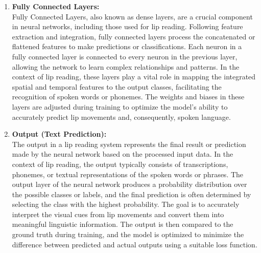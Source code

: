 \begin{enumerate}
	\item \textbf{Fully Connected Layers:}
	\\Fully Connected Layers, also known as dense layers, are a crucial component in neural networks, including those used for lip reading. Following feature extraction and integration, fully connected layers process the concatenated or flattened features to make predictions or classifications. Each neuron in a fully connected layer is connected to every neuron in the previous layer, allowing the network to learn complex relationships and patterns. In the context of lip reading, these layers play a vital role in mapping the integrated spatial and temporal features to the output classes, facilitating the recognition of spoken words or phonemes. The weights and biases in these layers are adjusted during training to optimize the model's ability to accurately predict lip movements and, consequently, spoken language.

	\item \textbf{Output (Text Prediction):}
	\\The output in a lip reading system represents the final result or prediction made by the neural network based on the processed input data. In the context of lip reading, the output typically consists of transcriptions, phonemes, or textual representations of the spoken words or phrases. The output layer of the neural network produces a probability distribution over the possible classes or labels, and the final prediction is often determined by selecting the class with the highest probability. The goal is to accurately interpret the visual cues from lip movements and convert them into meaningful linguistic information. The output is then compared to the ground truth during training, and the model is optimized to minimize the difference between predicted and actual outputs using a suitable loss function.

\end{enumerate}
        
    